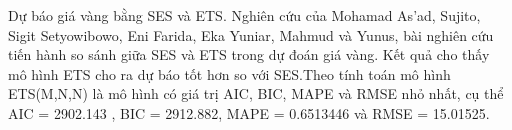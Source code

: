 Dự báo giá vàng bằng SES và ETS. Nghiên cứu của Mohamad As’ad, Sujito, Sigit Setyowibowo, Eni Farida, Eka Yuniar, Mahmud và Yunus\cite{article6}, bài nghiên cứu tiến hành so sánh giữa SES và ETS trong dự đoán giá vàng. Kết quả cho thấy mô hình ETS cho ra dự báo tốt hơn so với SES.Theo tính toán mô hình ETS(M,N,N) là mô hình có giá trị AIC, BIC, MAPE và RMSE nhỏ nhất, cụ thể AIC = 2902.143 , BIC = 2912.882, MAPE = 0.6513446  và RMSE = 15.01525.